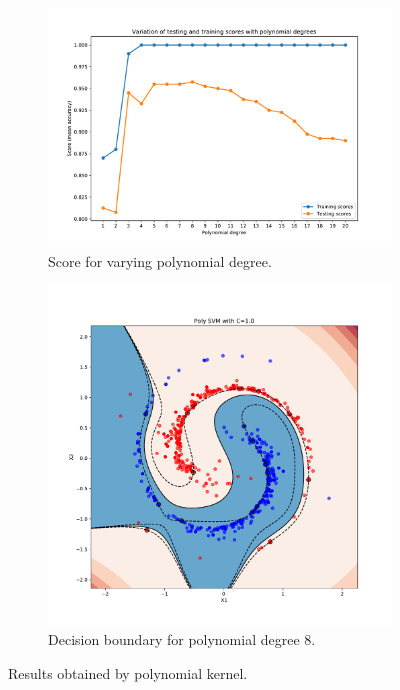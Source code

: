 \documentclass{article}
\begin{document}
\begin{figure}[!ht]
\centering
\begin{subfigure}{0.8\textwidth}
\centering
\includegraphics[width=\textwidth]{./Figures/2b_score_poly}
\caption{Score for varying polynomial degree.}
\label{2_score_poly}
\end{subfigure}

\begin{subfigure}{0.8\textwidth}
\centering
\includegraphics[width=\textwidth]{./Figures/2b_bound_poly}
\caption{Decision boundary for polynomial degree $8$.}
\label{2_bound_poly}
\end{subfigure}
\caption{Results obtained by polynomial kernel.}
\end{figure}
\end{document}
